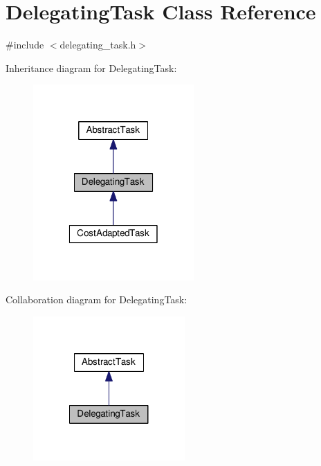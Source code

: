 \hypertarget{classDelegatingTask}{\section{Delegating\-Task Class Reference}
\label{classDelegatingTask}
}


{\ttfamily \#include $<$delegating\-\_\-task.\-h$>$}



Inheritance diagram for Delegating\-Task\-:
\nopagebreak
\begin{figure}[H]
\begin{center}
\leavevmode
\includegraphics[width=174pt]{classDelegatingTask__inherit__graph}
\end{center}
\end{figure}


Collaboration diagram for Delegating\-Task\-:
\nopagebreak
\begin{figure}[H]
\begin{center}
\leavevmode
\includegraphics[width=164pt]{classDelegatingTask__coll__graph}
\end{center}
\end{figure}
